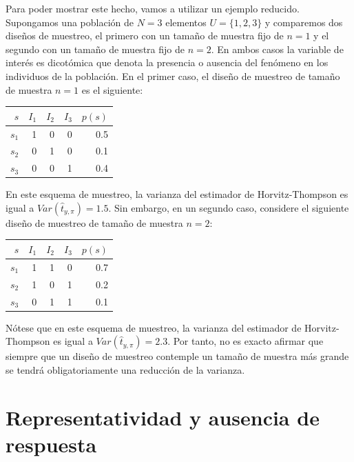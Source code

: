 \documentclass[
  12pt,
]{book}
\begin{document}
Para poder mostrar este hecho, vamos a utilizar un ejemplo reducido. Supongamos una población de \(N = 3\) elementos \(U=\{1, 2, 3\}\) y comparemos dos diseños de muestreo, el primero con un tamaño de muestra fijo de \(n=1\) y el segundo con un tamaño de muestra fijo de \(n=2\). En ambos casos la variable de interés es dicotómica que denota la presencia o ausencia del fenómeno en los individuos de la población. En el primer caso, el diseño de muestreo de tamaño de muestra \(n=1\) es el siguiente:

\begin{longtable}[]{@{}rrrrr@{}}
\toprule()
\(s\) & \(I_1\) & \(I_2\) & \(I_3\) & \(p(s)\) \\
\midrule()
\endhead
\(s_1\) & 1 & 0 & 0 & 0.5 \\
\(s_2\) & 0 & 1 & 0 & 0.1 \\
\(s_3\) & 0 & 0 & 1 & 0.4 \\
\bottomrule()
\end{longtable}

En este esquema de muestreo, la varianza del estimador de Horvitz-Thompson es igual a \(Var(\hat t_{y, \pi}) = 1.5\). Sin embargo, en un segundo caso, considere el siguiente diseño de muestreo de tamaño de muestra \(n=2\):

\begin{longtable}[]{@{}rrrrr@{}}
\toprule()
\(s\) & \(I_1\) & \(I_2\) & \(I_3\) & \(p(s)\) \\
\midrule()
\endhead
\(s_1\) & 1 & 1 & 0 & 0.7 \\
\(s_2\) & 1 & 0 & 1 & 0.2 \\
\(s_3\) & 0 & 1 & 1 & 0.1 \\
\bottomrule()
\end{longtable}

Nótese que en este esquema de muestreo, la varianza del estimador de Horvitz-Thompson es igual a \(Var(\hat t_{y, \pi}) = 2.3\). Por tanto, no es exacto afirmar que siempre que un diseño de muestreo contemple un tamaño de muestra más grande se tendrá obligatoriamente una reducción de la varianza.

\hypertarget{representatividad-y-ausencia-de-respuesta}{%
\chapter{Representatividad y ausencia de respuesta}\label{representatividad-y-ausencia-de-respuesta}}
\end{document}
